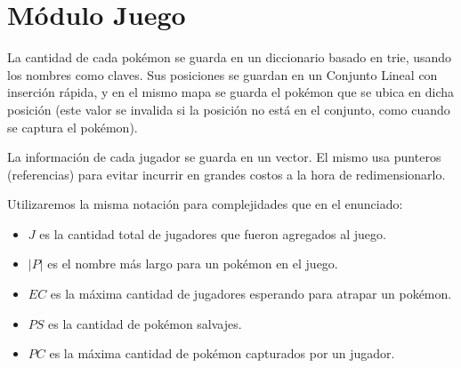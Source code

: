 \section{Módulo Juego}

La cantidad de cada pokémon se guarda en un diccionario basado en trie, usando los nombres como claves. Sus posiciones se guardan en un Conjunto Lineal con inserción rápida, y en el mismo mapa se guarda el pokémon que se ubica en dicha posición (este valor se invalida si la posición no está en el conjunto, como cuando se captura el pokémon).

La información de cada jugador se guarda en un vector. El mismo usa punteros (referencias) para evitar incurrir en grandes costos a la hora de redimensionarlo.

Utilizaremos la misma notación para complejidades que en el enunciado:

\begin{itemize}
	\item $J$ es la cantidad total de jugadores que fueron agregados al juego.

	\item $|P|$ es el nombre más largo para un pokémon en el juego.

	\item $EC$ es la máxima cantidad de jugadores esperando para atrapar un pokémon.

	\item $PS$ es la cantidad de pokémon salvajes.

	\item $PC$ es la máxima cantidad de pokémon capturados por un jugador.
\end{itemize}

